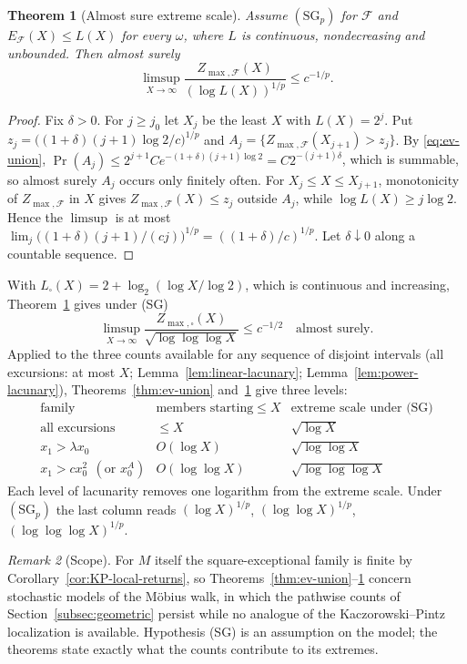 \documentclass[11pt]{amsart}
\numberwithin{equation}{section}
\theoremstyle{plain}
\newtheorem{theorem}{Theorem}[section]
\theoremstyle{definition}
\theoremstyle{remark}
\newtheorem{remark}[theorem]{Remark}
\newcommand{\F}{\mathcal{F}}
\begin{document}
\begin{theorem}[Almost sure extreme scale]
\label{thm:ev-as}
Assume $(\mathrm{SG}_p)$ for $\F$ and $E_\F(X)\le L(X)$ for every $\omega$,
where $L$ is continuous, nondecreasing and unbounded. Then almost surely
\[
\limsup_{X\to\infty}\frac{Z_{\max,\F}(X)}{(\log L(X))^{1/p}}\le c^{-1/p}.
\]
\end{theorem}

\begin{proof}
Fix $\delta>0$. For $j\ge j_0$ let $X_j$ be the least $X$ with $L(X)=2^j$.
Put $z_j=\bigl((1+\delta)(j+1)\log2/c\bigr)^{1/p}$ and
$A_j=\{Z_{\max,\F}(X_{j+1})>z_j\}$. By \eqref{eq:ev-union},
$\Pr(A_j)\le2^{j+1}Ce^{-(1+\delta)(j+1)\log2}=C2^{-(j+1)\delta}$, which is
summable, so almost surely $A_j$ occurs only finitely often. For
$X_j\le X\le X_{j+1}$, monotonicity of $Z_{\max,\F}$ in $X$ gives
$Z_{\max,\F}(X)\le z_j$ outside $A_j$, while $\log L(X)\ge j\log2$. Hence
the $\limsup$ is at most
$\lim_j\bigl((1+\delta)(j+1)/(cj)\bigr)^{1/p}=((1+\delta)/c)^{1/p}$. Let
$\delta\downarrow0$ along a countable sequence.
\end{proof}

With $L_\square(X)=2+\log_2(\log X/\log2)$, which is continuous and
increasing, Theorem~\ref{thm:ev-as} gives under (SG)
\[
\limsup_{X\to\infty}\frac{Z_{\max,\square}(X)}{\sqrt{\log\log\log X}}\le c^{-1/2}
\quad\text{almost surely.}
\]
Applied to the three counts available for any sequence of disjoint
intervals (all excursions: at most $X$; Lemma~\ref{lem:linear-lacunary};
Lemma~\ref{lem:power-lacunary}), Theorems~\ref{thm:ev-union}
and~\ref{thm:ev-as} give three levels:
\[
\begin{array}{c|c|c}
\text{family} & \text{members starting}\le X & \text{extreme scale under (SG)}\\
\hline
\text{all excursions} & \le X & \sqrt{\log X}\\
x_1>\lambda x_0 & O(\log X) & \sqrt{\log\log X}\\
x_1>cx_0^2\ \ (\text{or }x_0^A) & O(\log\log X) & \sqrt{\log\log\log X}
\end{array}
\]
Each level of lacunarity removes one logarithm from the extreme scale.
Under $(\mathrm{SG}_p)$ the last column reads $(\log X)^{1/p}$,
$(\log\log X)^{1/p}$, $(\log\log\log X)^{1/p}$.

\begin{remark}[Scope]
\label{rem:ev-scope}
For $M$ itself the square-exceptional family is finite by
Corollary~\ref{cor:KP-local-returns}, so
Theorems~\ref{thm:ev-union}--\ref{thm:ev-as} concern stochastic models of
the M\"obius walk, in which the pathwise counts of
Section~\ref{subsec:geometric} persist while no analogue of the
Kaczorowski--Pintz localization is available. Hypothesis (SG) is an
assumption on the model; the theorems state exactly what the counts
contribute to its extremes.
\end{remark}
\end{document}
